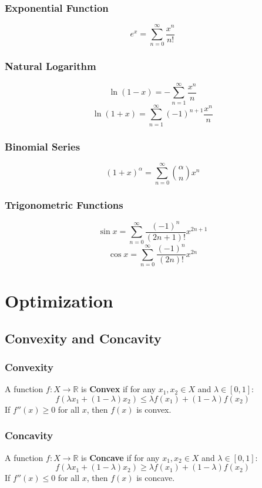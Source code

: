 \documentclass{article}
\begin{document}
\subsubsection{Exponential Function}

\[
    e^x = \sum_{n=0}^{\infty} \frac{x^n}{n!}
\]

\subsubsection{Natural Logarithm}

\[
    \ln(1 - x) = -\sum_{n=1}^{\infty} \frac{x^n}{n}
\]
\[
    \ln(1 + x) = \sum_{n=1}^{\infty} (-1)^{n+1} \frac{x^n}{n}
\]

\subsubsection{Binomial Series}

\[
    (1 + x)^\alpha = \sum_{n=0}^{\infty} \binom{\alpha}{n} x^n
\]

\subsubsection{Trigonometric Functions}

\[
    \sin x = \sum_{n=0}^{\infty} \frac{(-1)^n}{(2n + 1)!} x^{2n + 1}
\]
\[
    \cos x = \sum_{n=0}^{\infty} \frac{(-1)^n}{(2n)!} x^{2n}
\]


\newpage
\section{Optimization}

\subsection{Convexity and Concavity}

\subsubsection{Convexity}
A function $f: X \to \mathbb{R}$ is \textbf{Convex} if for any $x_1, x_2 \in X$ and $\lambda \in [0, 1]$:
\[
    f(\lambda x_1 + (1-\lambda) x_2) \le \lambda f(x_1) + (1-\lambda) f(x_2)
\]
If $f''(x) \ge 0$ for all $x$, then $f(x)$ is convex.

\subsubsection{Concavity}
A function $f: X \to \mathbb{R}$ is \textbf{Concave} if for any $x_1, x_2 \in X$ and $\lambda \in [0, 1]$:
\[
    f(\lambda x_1 + (1-\lambda) x_2) \ge \lambda f(x_1) + (1-\lambda) f(x_2)
\]
If $f''(x) \le 0$ for all $x$, then $f(x)$ is concave.
\end{document}
